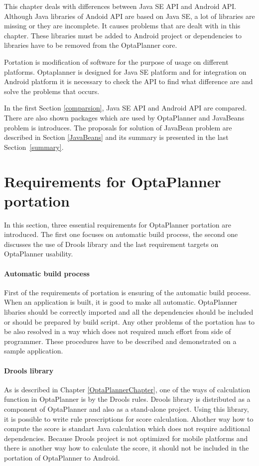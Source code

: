 This chapter deals with differences between Java SE API and Android API. Although Java libraries of Andoid API are based on Java SE, a lot of libraries are missing or they are incomplete. It causes problems that are dealt with in this chapter. These libraries must be added to Android project or dependencies to libraries have to be removed from the OptaPlanner core.

Portation is modification of software for the purpose of usage on different platforms. Optaplanner is designed for Java SE platform and for integration on Android platform it is necessary to check the API to find what difference are and solve the problems that occurs.

In the first Section \ref{comparsion}, Java SE API and Android API are compared. There are also shown packages which are used by OptaPlanner and JavaBeans problem is introduces. The proposals for solution of JavaBean problem are described in Section \ref{JavaBeans} and its summary is presented in the last Section~\ref{summary}.

\section{Requirements for OptaPlanner portation}\label{RequirementsPortationSection}
In this section, three essential requirements for OptaPlanner portation are introduced. The first one focuses on
automatic build process, the second one discusses the use of Drools library and the last requirement targets on
OptaPlanner usability.

\paragraph{Automatic build process}
First of the requirements of portation is ensuring of the automatic build process. When an application is built, it is
good to make all automatic. OptaPlanner libaries should be correctly imported and all the dependencies should be
included or should be prepared by build script. Any other problems of the portation has to be also resolved in a way
which does not required much effort from side of programmer. These procedures have to be described and demonstrated
on a sample application.

\paragraph{Drools library}
As is described in Chapter \ref{OptaPlannerChapter}, one of the ways of calculation function in OptaPlanner is by the
Drools rules. Drools library is distributed as a component of OptaPlanner and also as a stand-alone project. Using this
library, it is possible to write rule prescriptions for score calculation. Ahother way how to compute the score is
standart Java calculation which does not require additional dependencies. Because Drools project is not optimized for
mobile platforms and there is another way how to calculate the score, it should not be included in the portation of
OptaPlanner to Android.

